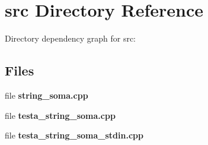 \section{src Directory Reference}
\label{dir_68267d1309a1af8e8297ef4c3efbcdba}
Directory dependency graph for src\+:
\subsection*{Files}
\begin{DoxyCompactItemize}
\item 
file \textbf{ string\+\_\+soma.\+cpp}
\item 
file \textbf{ testa\+\_\+string\+\_\+soma.\+cpp}
\item 
file \textbf{ testa\+\_\+string\+\_\+soma\+\_\+stdin.\+cpp}
\end{DoxyCompactItemize}
